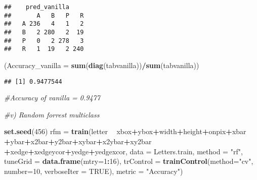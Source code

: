 \documentclass[]{article}
\newenvironment{Shaded}{\begin{snugshade}}{\end{snugshade}}
\newcommand{\CommentTok}[1]{\textcolor[rgb]{0.56,0.35,0.01}{\textit{#1}}}
\newcommand{\DataTypeTok}[1]{\textcolor[rgb]{0.13,0.29,0.53}{#1}}
\newcommand{\DecValTok}[1]{\textcolor[rgb]{0.00,0.00,0.81}{#1}}
\newcommand{\KeywordTok}[1]{\textcolor[rgb]{0.13,0.29,0.53}{\textbf{#1}}}
\newcommand{\NormalTok}[1]{#1}
\newcommand{\OperatorTok}[1]{\textcolor[rgb]{0.81,0.36,0.00}{\textbf{#1}}}
\newcommand{\OtherTok}[1]{\textcolor[rgb]{0.56,0.35,0.01}{#1}}
\newcommand{\StringTok}[1]{\textcolor[rgb]{0.31,0.60,0.02}{#1}}
\begin{document}
\begin{verbatim}
##    pred_vanilla
##       A   B   P   R
##   A 236   4   1   2
##   B   2 280   2  19
##   P   0   2 278   3
##   R   1  19   2 240
\end{verbatim}

\begin{Shaded}
\begin{Highlighting}[]
\NormalTok{(}\DataTypeTok{Accuracy_vanilla =} \KeywordTok{sum}\NormalTok{(}\KeywordTok{diag}\NormalTok{(tabvanilla))}\OperatorTok{/}\KeywordTok{sum}\NormalTok{(tabvanilla))}
\end{Highlighting}
\end{Shaded}

\begin{verbatim}
## [1] 0.9477544
\end{verbatim}

\begin{Shaded}
\begin{Highlighting}[]
\CommentTok{#Accuracy of vanilla = 0.9477}




  \CommentTok{#v) Random forrest multiclass }

\KeywordTok{set.seed}\NormalTok{(}\DecValTok{456}\NormalTok{)}
\NormalTok{rfm =}\StringTok{  }\KeywordTok{train}\NormalTok{(letter }\OperatorTok{~}\StringTok{ }\NormalTok{xbox}\OperatorTok{+}\NormalTok{ybox}\OperatorTok{+}\NormalTok{width}\OperatorTok{+}\NormalTok{height}\OperatorTok{+}\NormalTok{onpix}\OperatorTok{+}\NormalTok{xbar}
            \OperatorTok{+}\NormalTok{ybar}\OperatorTok{+}\NormalTok{x2bar}\OperatorTok{+}\NormalTok{y2bar}\OperatorTok{+}\NormalTok{xybar}\OperatorTok{+}\NormalTok{x2ybar}\OperatorTok{+}\NormalTok{xy2bar}
            \OperatorTok{+}\NormalTok{xedge}\OperatorTok{+}\NormalTok{xedgeycor}\OperatorTok{+}\NormalTok{yedge}\OperatorTok{+}\NormalTok{yedgexcor, }\DataTypeTok{data =}\NormalTok{ Letters.train,}
            \DataTypeTok{method =} \StringTok{"rf"}\NormalTok{,}
            \DataTypeTok{tuneGrid =} \KeywordTok{data.frame}\NormalTok{(}\DataTypeTok{mtry=}\DecValTok{1}\OperatorTok{:}\DecValTok{16}\NormalTok{),}
            \DataTypeTok{trControl =} \KeywordTok{trainControl}\NormalTok{(}\DataTypeTok{method=}\StringTok{"cv"}\NormalTok{, }\DataTypeTok{number=}\DecValTok{10}\NormalTok{, }\DataTypeTok{verboseIter =} \OtherTok{TRUE}\NormalTok{),}
            \DataTypeTok{metric =} \StringTok{"Accuracy"}\NormalTok{)}
\end{Highlighting}
\end{Shaded}
\end{document}

